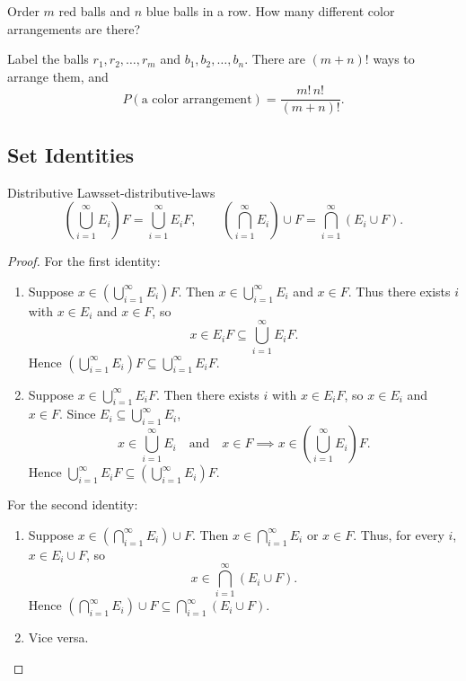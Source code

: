 \begin{example}
  Order $m$ red balls and $n$ blue balls in a row. How many different color arrangements are there?

  Label the balls $r_1,r_2,\ldots,r_m$ and $b_1,b_2,\ldots,b_n$.
  There are $(m+n)!$ ways to arrange them, and
  \[
    P(\text{a color arrangement})=\frac{m!\,n!}{(m+n)!}.
  \]
\end{example}

\subsection{Set Identities}

\begin{theorem}{Distributive Laws}{set-distributive-laws}
  \[
    \left(\bigcup_{i=1}^{\infty}E_i\right)F
    =\bigcup_{i=1}^{\infty}E_iF,
    \qquad
    \left(\bigcap_{i=1}^{\infty}E_i\right)\cup F
    =\bigcap_{i=1}^{\infty}(E_i\cup F).
  \]
\end{theorem}

\begin{proof}
  For the first identity:
  \begin{enumerate}[label=(\roman*)]
    \item Suppose $x\in\left(\bigcup_{i=1}^{\infty}E_i\right)F$.
          Then $x\in\bigcup_{i=1}^{\infty}E_i$ and $x\in F$.
          Thus there exists $i$ with $x\in E_i$ and $x\in F$, so
          \[
            x\in E_iF\subseteq\bigcup_{i=1}^{\infty}E_iF.
          \]
          Hence $\left(\bigcup_{i=1}^{\infty}E_i\right)F
            \subseteq\bigcup_{i=1}^{\infty}E_iF$.
    \item Suppose $x\in\bigcup_{i=1}^{\infty}E_iF$.
          Then there exists $i$ with $x\in E_iF$, so $x\in E_i$ and $x\in F$.
          Since $E_i\subseteq\bigcup_{i=1}^{\infty}E_i$,
          \[
            x\in\bigcup_{i=1}^{\infty}E_i\quad\text{and}\quad x\in F
            \implies x\in\left(\bigcup_{i=1}^{\infty}E_i\right)F.
          \]
          Hence $\bigcup_{i=1}^{\infty}E_iF
            \subseteq\left(\bigcup_{i=1}^{\infty}E_i\right)F$.
  \end{enumerate}
  For the second identity:
  \begin{enumerate}[label=(\roman*)]
    \item Suppose $x\in\left(\bigcap_{i=1}^{\infty}E_i\right)\cup F$.
          Then $x\in\bigcap_{i=1}^{\infty}E_i$ or $x\in F$.
          Thus, for every $i$, $x\in E_i\cup F$, so
          \[
            x\in\bigcap_{i=1}^{\infty}(E_i\cup F).
          \]
          Hence $\left(\bigcap_{i=1}^{\infty}E_i\right)\cup F
            \subseteq\bigcap_{i=1}^{\infty}(E_i\cup F)$.
    \item Vice versa.\qedhere
  \end{enumerate}
\end{proof}

